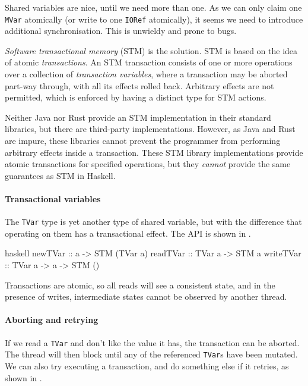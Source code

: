 Shared variables are nice, until we need more than one.  As we can
only claim one \verb|MVar| atomically (or write to one \verb|IORef|
atomically), it seems we need to introduce additional synchronisation.
This is unwieldy and prone to bugs.

\emph{Software transactional memory} (STM)\cite{harris2005,shavit1995}
is the solution.  STM is based on the idea of atomic
\emph{transactions}.  An STM transaction consists of one or more
operations over a collection of \emph{transaction variables}, where a
transaction may be aborted part-way through, with all its effects
rolled back.  Arbitrary effects are not permitted, which is enforced
by having a distinct type for STM actions.

Neither Java nor Rust provide an STM implementation in their standard
libraries, but there are third-party implementations.  However, as
Java and Rust are impure, these libraries cannot prevent the
programmer from performing arbitrary effects inside a transaction.
These STM library implementations provide atomic transactions for
specified operations, but they \emph{cannot} provide the same
guarantees as STM in Haskell.

\paragraph{Transactional variables}
The \verb|TVar| type is yet another type of shared variable, but with
the difference that operating on them has a transactional effect.  The
API is shown in .

\begin{listing}
\centering
\begin{cminted}{haskell}
newTVar   :: a -> STM (TVar a)
readTVar  :: TVar a -> STM a
writeTVar :: TVar a -> a -> STM ()
\end{cminted}
\caption{Transactional variables in Haskell.}\label{lst:tvars_haskell}
\end{listing}

Transactions are atomic, so all reads will see a consistent state, and
in the presence of writes, intermediate states cannot be observed by
another thread.

\paragraph{Aborting and retrying}
If we read a \verb|TVar| and don't like the value it has, the
transaction can be aborted.  The thread will then block until any of
the referenced \verb|TVar|s have been mutated.  We can also try
executing a transaction, and do something else if it retries, as shown
in .

